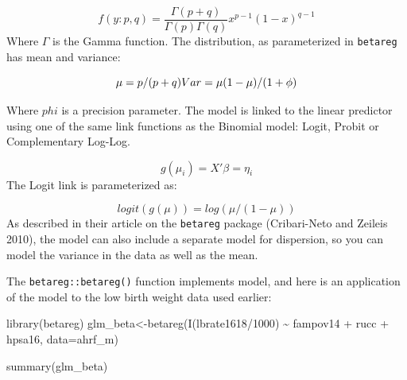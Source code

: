 \documentclass[
  letterpaper,
  DIV=11,
  numbers=noendperiod]{scrreprt}
\newenvironment{Shaded}{\begin{snugshade}}{\end{snugshade}}
\newcommand{\AttributeTok}[1]{\textcolor[rgb]{0.40,0.45,0.13}{#1}}
\newcommand{\DecValTok}[1]{\textcolor[rgb]{0.68,0.00,0.00}{#1}}
\newcommand{\FunctionTok}[1]{\textcolor[rgb]{0.28,0.35,0.67}{#1}}
\newcommand{\NormalTok}[1]{\textcolor[rgb]{0.00,0.23,0.31}{#1}}
\newcommand{\OtherTok}[1]{\textcolor[rgb]{0.00,0.23,0.31}{#1}}
\newcommand{\SpecialCharTok}[1]{\textcolor[rgb]{0.37,0.37,0.37}{#1}}
\begin{document}
\[
f(y:p,q) = \frac{\Gamma(p +
q)}{\Gamma(p)\Gamma(q)}x^{p - 1}(1 - x)^{q - 1}
\] Where \(\Gamma\) is the Gamma function. The distribution, as
parameterized in \texttt{betareg} has mean and variance:

\[
\mu = p/(p+q) \\
Var = \mu (1-\mu)/ (1+\phi)
\]

Where \(phi\) is a precision parameter. The model is linked to the
linear predictor using one of the same link functions as the Binomial
model: Logit, Probit or Complementary Log-Log.

\[g(\mu_i) = X'\beta = \eta_i\] The Logit link is parameterized as:

\[logit(g(\mu)) = log(\mu / (1-\mu))\] As described in their article on
the \texttt{betareg} package (Cribari-Neto and Zeileis 2010), the model
can also include a separate model for dispersion, so you can model the
variance in the data as well as the mean.

The \texttt{betareg::betareg()} function implements model, and here is
an application of the model to the low birth weight data used earlier:

\begin{Shaded}
\begin{Highlighting}[]
\FunctionTok{library}\NormalTok{(betareg)}
\NormalTok{glm\_beta}\OtherTok{\textless{}{-}}\FunctionTok{betareg}\NormalTok{(}\FunctionTok{I}\NormalTok{(lbrate1618}\SpecialCharTok{/}\DecValTok{1000}\NormalTok{) }\SpecialCharTok{\textasciitilde{}}\NormalTok{  fampov14 }\SpecialCharTok{+}\NormalTok{ rucc }\SpecialCharTok{+}\NormalTok{ hpsa16, }
                  \AttributeTok{data=}\NormalTok{ahrf\_m)}

\FunctionTok{summary}\NormalTok{(glm\_beta)}
\end{Highlighting}
\end{Shaded}
\end{document}
